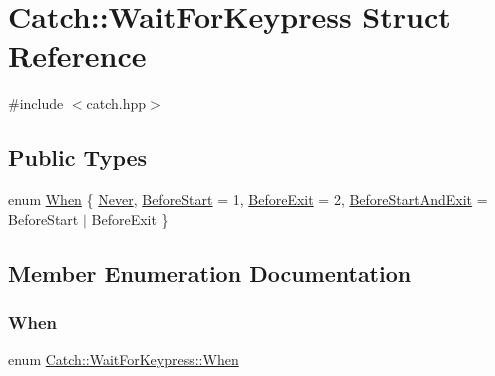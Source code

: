 \hypertarget{struct_catch_1_1_wait_for_keypress}{}\section{Catch\+:\+:Wait\+For\+Keypress Struct Reference}
\label{struct_catch_1_1_wait_for_keypress}


{\ttfamily \#include $<$catch.\+hpp$>$}

\subsection*{Public Types}
\begin{DoxyCompactItemize}
\item 
enum \mbox{\hyperlink{struct_catch_1_1_wait_for_keypress_a2e8c4369d0a605d64e3e83b5af3399ba}{When}} \{ \mbox{\hyperlink{struct_catch_1_1_wait_for_keypress_a2e8c4369d0a605d64e3e83b5af3399baa3a78e4f64675e7ce54ffd29e6109f1ce}{Never}}, 
\mbox{\hyperlink{struct_catch_1_1_wait_for_keypress_a2e8c4369d0a605d64e3e83b5af3399baaba7f6d9b2377122a118b371ab7ae3185}{Before\+Start}} = 1, 
\mbox{\hyperlink{struct_catch_1_1_wait_for_keypress_a2e8c4369d0a605d64e3e83b5af3399baad6c3e4a5797b7ee0a812e4fc88128983}{Before\+Exit}} = 2, 
\mbox{\hyperlink{struct_catch_1_1_wait_for_keypress_a2e8c4369d0a605d64e3e83b5af3399baae8beb496b712aef908028a7cbfdd0c46}{Before\+Start\+And\+Exit}} = Before\+Start $\vert$ Before\+Exit
 \}
\end{DoxyCompactItemize}


\subsection{Member Enumeration Documentation}
\mbox{\label{struct_catch_1_1_wait_for_keypress_a2e8c4369d0a605d64e3e83b5af3399ba}} 
\subsubsection{\texorpdfstring{When}{When}}
{\footnotesize\ttfamily enum \mbox{\hyperlink{struct_catch_1_1_wait_for_keypress_a2e8c4369d0a605d64e3e83b5af3399ba}{Catch\+::\+Wait\+For\+Keypress\+::\+When}}}

